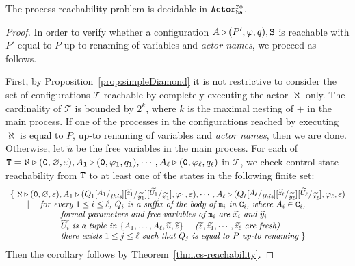 \documentclass{LMCS}
\newcommand{\cal}{\mathcal}
\theoremstyle{plain}\newtheorem{proposition}[thm]{Proposition}
\theoremstyle{plain}\newtheorem{lemma}[thm]{Lemma}
\theoremstyle{plain}\newtheorem{theorem}[thm]{Theorem}
\theoremstyle{plain}\newtheorem{corollary}[thm]{Corollary}
\newcommand{\subst}[2]{[\raisebox{.5ex}{\footnotesize$#1$}  /
                        \raisebox{-.5ex}{\footnotesize$#2$} ]}
\newcommand{\pinull}{{\tt 0}}
\newcommand{\State}{{\tt S}}
\newcommand{\StateT}{{\tt T}}
\newcommand{\wt}[1]{\widetilde{#1}}
\newcommand{\adef}[1]{{\tt #1}}
\newcommand{\actroba}{${\tt Actor^{\tt ro}_{\tt ba}}$}
\begin{document}
\begin{cor}
The process reachability problem
is decidable in {\actroba}.
\end{cor}

\begin{proof}
In order to verify whether a configuration 
$A \triangleright (P', \varphi, q),\State$
is reachable with $P'$ equal to $P$ up-to renaming of variables and \emph{actor names},
we  proceed as follows.

First, by Proposition~\ref{prop:simpleDiamond}
it is not restrictive to consider the set of configurations ${\cal T}$
reachable by completely executing the actor $\aleph$ only.
The cardinality of ${\cal T}$ is bounded by $2^k$, where $k$ is the maximal nesting
of $+$ in the main process. 
If one of the processes in the configurations reached by executing $\aleph$ is
equal to $P$, up-to renaming of variables and \emph{actor names}, then we are done.
Otherwise, let $\wt{u}$ be the free variables in the main process.
For each of 
$\StateT=\aleph \triangleright (\pinull , \varnothing, \varepsilon),
A_1 \triangleright (\pinull, \varphi_1, q_1), \cdots , A_\ell \triangleright (\pinull, \varphi_\ell, q_\ell)$ in ${\cal T}$,
we check control-state reachability
from 
$\StateT$ to at least one of the states
in the following finite set:
\[
\begin{array}{l}
\{\ \aleph \triangleright (\pinull , \varnothing, \varepsilon),A_1 \triangleright (Q_1\subst{A_1}{{\it this}}\subst{\wt{z_1}}{\wt{y_1}}\subst{\wt{U_1}}{\wt{x_1}} , \varphi_1, \varepsilon), \cdots , A_\ell \triangleright (
Q_\ell\subst{A_\ell}{{\it this}}\subst{\wt{z_\ell}}{\wt{y_\ell}}\subst{\wt{U_\ell}}{\wt{x_\ell}}
, \varphi_\ell, \varepsilon) 
\\
\qquad \mid \quad
\mbox{\em for every $1\leq i\leq \ell$, $Q_i$ is a suffix of the body of ${\tt m}_i$ in 
$\adef{C}_i$, where $A_i \in \adef{C}_i$,}
\\
\qquad \qquad\qquad
\mbox{\em formal parameters and 
free variables of ${\tt m}_i$ are $\wt{x_i}$ and $\wt{y_i}$}
\\
\qquad\qquad\qquad
\mbox{\em $\wt{U_i}$ is a tuple in $\{A_1,\ldots,A_\ell, \wt{u}, \wt{z}\}$
\quad ($\wt{z}, \wt{z_1}, \cdots, \wt{z_\ell}$ are fresh) }
 \\
\qquad\qquad\qquad
\mbox{\em there exists $1\leq j \leq \ell$ such that $Q_j$ is
equal to $P$ up-to renaming}
\ \}
\end{array}
\]
Then the corollary follows by Theorem~\ref{thm.cs-reachability}.
\end{proof}
\end{document}
